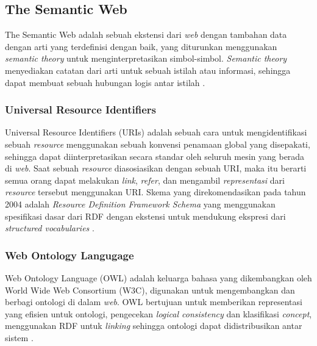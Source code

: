 \subsection{The Semantic Web}
\label{subsec:the-semantic-web}

The Semantic Web adalah sebuah ekstensi dari \textit{web} dengan tambahan data dengan arti yang terdefinisi dengan baik, yang diturunkan menggunakan \textit{semantic theory} untuk menginterpretasikan simbol-simbol. \textit{Semantic theory} menyediakan catatan dari arti untuk sebuah istilah atau informasi, sehingga dapat membuat sebuah hubungan logis antar istilah \parencite{shadbolt2006semantic}.

\subsubsection{Universal Resource Identifiers}
\label{subsubsec:universal-resource-identifiers}

Universal Resource Identifiers (URIs) adalah sebuah cara untuk mengidentifikasi sebuah \textit{resource} menggunakan sebuah konvensi penamaan global yang disepakati, sehingga dapat diinterpretasikan secara standar oleh seluruh mesin yang berada di \textit{web}. Saat sebuah \textit{resource} diasosiasikan dengan sebuah URI, maka itu berarti semua orang dapat melakukan \textit{link}, \textit{refer}, dan mengambil \textit{representasi} dari \textit{resource} tersebut menggunakan URI. Skema yang direkomendasikan pada tahun 2004 adalah \textit{Resource Definition Framework Schema} yang menggunakan spesifikasi dasar dari RDF dengan ekstensi untuk mendukung ekspresi dari \textit{structured vocabularies} \parencite{shadbolt2006semantic}.

\subsubsection{Web Ontology Langugage}
\label{subsubsec:web-ontology-language}

Web Ontology Language (OWL) adalah keluarga bahasa yang dikembangkan oleh World Wide Web Consortium (W3C), digunakan untuk mengembangkan dan berbagi ontologi di dalam \textit{web}. OWL bertujuan untuk memberikan representasi yang efisien untuk ontologi, pengecekan \textit{logical consistency} dan klasifikasi \textit{concept}, menggunakan RDF untuk \textit{linking} sehingga ontologi dapat didistribusikan antar sistem \parencite{shadbolt2006semantic}.